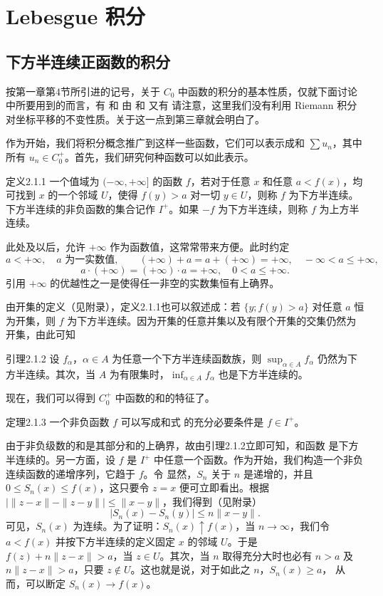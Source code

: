 \chapter{Lebesgue 积分}
\section{下方半连续正函数的积分}
按第一章第4节所引进的记号，关于 $C_0$ 中函数的积分的基本性质，仅就下面讨论中所要用到的而言，有
和
由  和  又有
请注意，这里我们没有利用 Riemann 积分对坐标平移的不变性质。关于这一点到第三章就会明白了。

作为开始，我们将积分概念推广到这样一些函数，它们可以表示成和 $\sum u_n$，其中所有 $u_n\in C_0^+$。首先，我们研究何种函数可以如此表示。
\begin{statement}{定义}{2.1.1}
一个值域为 $(-\infty,+\infty]$ 的函数 $f$，若对于任意 $x$ 和任意 $a<f(x)$，均可找到 $x$ 的一个邻域 $U$，使得 $f(y)>a$ 对一切 $y\in U$，则称 $f$ 为下方半连续。下方半连续的非负函数的集合记作 $I^+$。如果 $-f$ 为下方半连续，则称 $f$ 为上方半连续。
\end{statement}
此处及以后，允许 $+\infty$ 作为函数值，这常常带来方便。此时约定
\[a<+\infty,\quad a\text{ 为一实数值},\qquad (+\infty)+a=a+(+\infty)=+\infty,\quad-\infty<a\le+\infty,\]
\[a\cdot(+\infty)=(+\infty)\cdot a=+\infty,\quad0<a\le+\infty.\]
引用 $+\infty$ 的优越性之一是使得任一非空的实数集恒有上确界。

由开集的定义（见附录），定义2.1.1也可以叙述成：若 $\{y;f(y)>a\}$ 对任意 $a$ 恒为开集，则 $f$ 为下方半连续。因为开集的任意并集以及有限个开集的交集仍然为开集，由此可知
\begin{statement}{引理}{2.1.2}
设 $f_\alpha$，$\alpha\in A$ 为任意一个下方半连续函数族，则 $\sup_{\alpha\in A}f_\alpha$ 仍然为下方半连续。其次，当 $A$ 为有限集时，$\inf_{\alpha\in A}f_\alpha$ 也是下方半连续的。
\end{statement}
现在，我们可以得到 $C_0^+$ 中函数的和的特征了。
\begin{statement}{定理}{2.1.3}
一个非负函数 $f$ 可以写成和式
的充分必要条件是 $f\in I^+$。
\end{statement}
\Proof 由于非负级数的和是其部分和的上确界，故由引理2.1.2立即可知，和函数  是下方半连续的。另一方面，设 $f$ 是 $I^+$ 中任意一个函数。作为开始，我们构造一个非负连续函数的递增序列，它趋于 $f$。令
显然，$S_n$ 关于 $n$ 是递增的，并且 $0\le S_n(x)\le f(x)$，这只要令 $z=x$ 便可立即看出。根据 $|\|z-x\|-\|z-y\||\le\|x-y\|$，我们得到（见附录）
\[|S_n(x)-S_n(y)|\le n\|x-y\|.\]
可见，$S_n(x)$ 为连续。为了证明：$S_n(x)\uparrow f(x)$，当 $n\to\infty$，我们令 $a<f(x)$ 并按下方半连续的定义固定 $x$ 的邻域 $U$。于是 $f(z)+n\|z-x\|>a$，当 $z\in U$。其次，当 $n$ 取得充分大时也必有 $n>a$ 及 $n\|z-x\|>a$，只要 $z\notin U$。这也就是说，对于如此之 $n$，$S_n(x)\ge a$，
从而，可以断定 $S_n(x)\to f(x)$。

